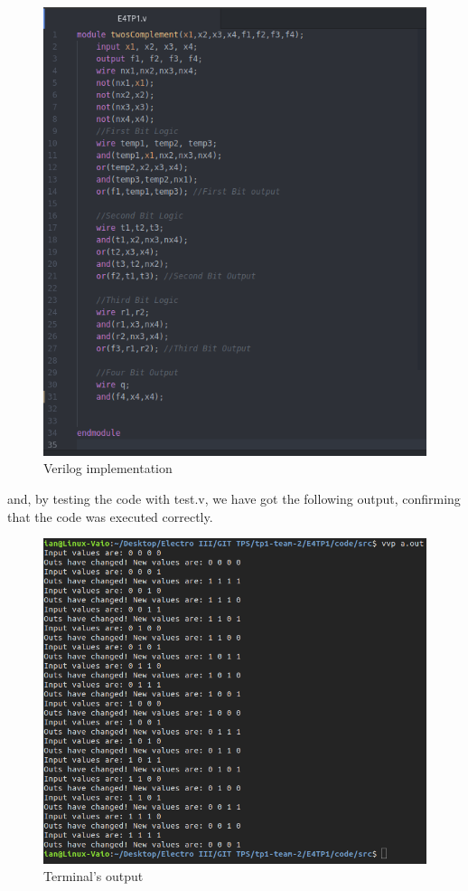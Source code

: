 \begin{figure}[!] %
\begin{centering}
\includegraphics[scale=0.4]{E4TP1/images/5}
\par\end{centering}
\caption{Verilog implementation}
\end{figure}

and, by testing the code with test.v, we have got the following output,
confirming that the code was executed correctly.

\begin{figure}[!]%
\begin{centering}
\includegraphics[scale=0.4]{E4TP1/images/6}
\par\end{centering}
\caption{Terminal's output}
\end{figure}

%
